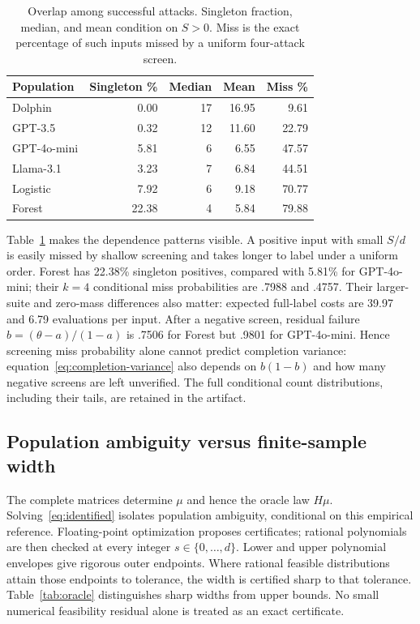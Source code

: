 \documentclass[conference]{IEEEtran}
\begin{document}
\begin{table}[t]
\caption{Overlap among successful attacks. Singleton fraction, median, and mean condition on $S>0$. Miss is the exact percentage of such inputs missed by a uniform four-attack screen.}\label{tab:overlap}
\centering
\begin{tabular}{lrrrr}
\toprule
Population&Singleton \%&Median&Mean&Miss \%\\
\midrule
Dolphin&0.00&17&16.95&9.61\\
GPT-3.5&0.32&12&11.60&22.79\\
GPT-4o-mini&5.81&6&6.55&47.57\\
Llama-3.1&3.23&7&6.84&44.51\\
Logistic&7.92&6&9.18&70.77\\
Forest&22.38&4&5.84&79.88\\
\bottomrule
\end{tabular}
\end{table}

Table~\ref{tab:overlap} makes the dependence patterns visible. A positive input with small $S/d$ is easily missed by shallow screening and takes longer to label under a uniform order. Forest has 22.38\% singleton positives, compared with 5.81\% for GPT-4o-mini; their $k=4$ conditional miss probabilities are .7988 and .4757. Their larger-suite and zero-mass differences also matter: expected full-label costs are 39.97 and 6.79 evaluations per input. After a negative screen, residual failure $b=(\theta-a)/(1-a)$ is .7506 for Forest but .9801 for GPT-4o-mini. Hence screening miss probability alone cannot predict completion variance: equation~\eqref{eq:completion-variance} also depends on $b(1-b)$ and how many negative screens are left unverified. The full conditional count distributions, including their tails, are retained in the artifact.

\subsection{Population ambiguity versus finite-sample width}
The complete matrices determine $\mu$ and hence the oracle law $H\mu$. Solving~\eqref{eq:identified} isolates population ambiguity, conditional on this empirical reference. Floating-point optimization proposes certificates; rational polynomials are then checked at every integer $s\in\{0,\ldots,d\}$. Lower and upper polynomial envelopes give rigorous outer endpoints. Where rational feasible distributions attain those endpoints to tolerance, the width is certified sharp to that tolerance. Table~\ref{tab:oracle} distinguishes sharp widths from upper bounds. No small numerical feasibility residual alone is treated as an exact certificate.
\end{document}

